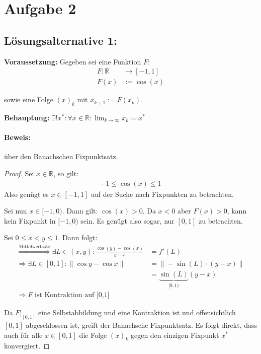 \section*{Aufgabe 2}

\subsection*{Lösungsalternative 1:}

\textbf{Voraussetzung:} 
Gegeben sei eine Funktion $F$:
\begin{align*}
    F: \mathbb{R} &\rightarrow [-1, 1]\\
    F(x) &:= \cos(x)
\end{align*}

sowie eine Folge $(x)_k$ mit $x_{k+1} := F(x_k)$.

\textbf{Behauptung:} $\displaystyle \exists! x^*: \forall x \in \mathbb{R}: \lim_{k \rightarrow \infty} x_k = x^*$

\paragraph{Beweis:} über den Banachschen Fixpunktsatz.
\begin{proof}
Sei $ x \in \mathbb{R}$, so gilt:
\begin{align*}
	-1 \leq \cos(x) \leq 1
\end{align*}
Also genügt es $x \in [-1, 1]$ auf der Suche nach Fixpunkten zu betrachten.

Sei nun $x \in [-1, 0)$. Dann gilt: $\cos(x) > 0$. Da $x <0$ aber $F(x) > 0$,
kann kein Fixpunkt in $[-1, 0)$ sein. Es genügt also sogar,
nur $[0, 1]$ zu betrachten.

Sei $0 \leq x < y \leq 1$. Dann folgt:
\begin{align}
    \stackrel{\text{Mittelwertsatz}}{\Rightarrow} \exists L \in (x,y): \frac{\cos(y) - \cos(x)}{y-x} &= f'(L)\\
    \Rightarrow \exists L \in [0,1]: \| \cos y - \cos x \| &= \| - \sin(L) \cdot (y-x)\| \\
    &= \underbrace{\sin(L)}_{[0,1)} (y-x)\\
   \Rightarrow F \text{ ist Kontraktion auf [0,1]}
\end{align}

Da $F|_{[0,1]}$ eine Selbstabbildung und eine Kontraktion ist und
offensichtlich $[0,1]$ abgeschlossen ist, greift der 
Banachsche Fixpunktsatz. Es folgt direkt, dass auch für alle $x \in [0,1]$
die Folge $(x)_k$ gegen den einzigen Fixpunkt $x^*$ konvergiert.
\end{proof}

